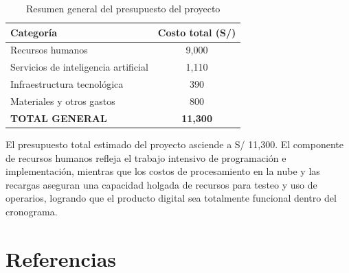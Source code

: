 \documentclass[12pt,a4paper,oneside]{article}
\begin{document}
\begin{table}[H]
\centering
\caption{Resumen general del presupuesto del proyecto}
\begin{tabular}{|p{6cm}|c|}
\hline
\rowcolor{gray!20}
\textbf{Categor\'ia} & \textbf{Costo total (S/)} \\
\hline
Recursos humanos & 9{,}000 \\
\hline
Servicios de inteligencia artificial & 1{,}110 \\
\hline
Infraestructura tecnol\'ogica & 390 \\
\hline
Materiales y otros gastos & 800 \\
\hline
\textbf{TOTAL GENERAL} & \textbf{11{,}300} \\
\hline
\end{tabular}
\label{tab:presupuesto_resumen}
\end{table}

El presupuesto total estimado del proyecto asciende a S/ 11{,}300. El componente de recursos humanos refleja el trabajo intensivo de programaci\'on e implementaci\'on, mientras que los costos de procesamiento en la nube y las recargas aseguran una capacidad holgada de recursos para testeo y uso de operarios, logrando que el producto digital sea totalmente funcional dentro del cronograma.


\section*{Referencias}
\end{document}

